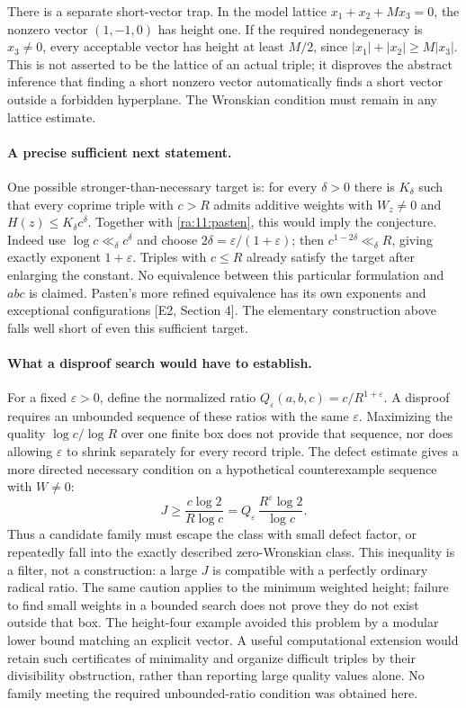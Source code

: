 \documentclass[11pt]{article}
\begin{document}
There is a separate short-vector trap. In the model lattice
$x_1+x_2+Mx_3=0$, the nonzero vector $(1,-1,0)$ has height one.
If the required nondegeneracy is $x_3\ne0$, every acceptable vector
has height at least $M/2$, since
$|x_1|+|x_2|\ge M|x_3|$. This is not asserted to be the lattice of an
actual triple; it disproves the abstract inference that finding a short
nonzero vector automatically finds a short vector outside a forbidden
hyperplane. The Wronskian condition must remain in any lattice estimate.

\paragraph{A precise sufficient next statement.}
One possible stronger-than-necessary target is: for every $\delta>0$
there is $K_\delta$ such that every coprime triple with $c>R$ admits
additive weights with $W_z\ne0$ and $H(z)\le K_\delta c^\delta$.
Together with \eqref{ra:11:pasten}, this would imply the conjecture.
Indeed use $\log c\ll_\delta c^\delta$ and choose
$2\delta=\varepsilon/(1+\varepsilon)$; then
$c^{1-2\delta}\ll_\delta R$, giving exactly exponent $1+\varepsilon$.
Triples with $c\le R$ already satisfy the target after enlarging the
constant. No equivalence between this particular formulation and $abc$
is claimed. Pasten's more refined equivalence has its own exponents and
exceptional configurations [E2, Section 4]. The elementary construction
above falls well short of even this sufficient target.

\paragraph{What a disproof search would have to establish.}
For a fixed $\varepsilon>0$, define the normalized ratio
$Q_\varepsilon(a,b,c)=c/R^{1+\varepsilon}$.
A disproof requires an unbounded sequence of these ratios with the same
$\varepsilon$. Maximizing the quality $\log c/\log R$ over one finite
box does not provide that sequence, nor does allowing $\varepsilon$ to
shrink separately for every record triple. The defect estimate gives a
more directed necessary condition on a hypothetical counterexample
sequence with $W\ne0$:
\[
 J\ge\frac{c\log2}{R\log c}
       =Q_\varepsilon\,\frac{R^\varepsilon\log2}{\log c}.
\]
Thus a candidate family must escape the class with small defect factor,
or repeatedly fall into the exactly described zero-Wronskian class.
This inequality is a filter, not a construction: a large $J$ is
compatible with a perfectly ordinary radical ratio. The same caution
applies to the minimum weighted height; failure to find small weights
in a bounded search does not prove they do not exist outside that box.
The height-four example avoided this problem by a modular lower bound
matching an explicit vector. A useful computational extension would
retain such certificates of minimality and organize difficult triples
by their divisibility obstruction, rather than reporting large quality
values alone. No family meeting the required unbounded-ratio condition
was obtained here.
\end{document}
